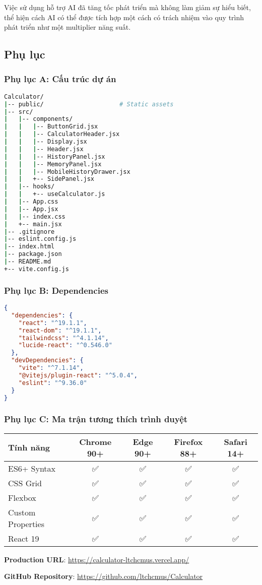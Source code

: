 Việc sử dụng hỗ trợ AI đã tăng tốc phát triển mà không làm giảm sự hiểu biết, thể hiện cách AI có thể được tích hợp một cách có trách nhiệm vào quy trình phát triển như một multiplier năng suất.

\subsection{Phụ lục}

\subsubsection{Phụ lục A: Cấu trúc dự án}

\begin{lstlisting}[language=bash, caption=Cấu trúc thư mục đầy đủ]
Calculator/
|-- public/                     # Static assets
|-- src/
|   |-- components/
|   |   |-- ButtonGrid.jsx
|   |   |-- CalculatorHeader.jsx
|   |   |-- Display.jsx
|   |   |-- Header.jsx
|   |   |-- HistoryPanel.jsx
|   |   |-- MemoryPanel.jsx
|   |   |-- MobileHistoryDrawer.jsx
|   |   +-- SidePanel.jsx
|   |-- hooks/
|   |   +-- useCalculator.js
|   |-- App.css
|   |-- App.jsx
|   |-- index.css
|   +-- main.jsx
|-- .gitignore
|-- eslint.config.js
|-- index.html
|-- package.json
|-- README.md
+-- vite.config.js
\end{lstlisting}

\subsubsection{Phụ lục B: Dependencies}

\begin{lstlisting}[language=JSON, caption=Package.json dependencies]
{
  "dependencies": {
    "react": "^19.1.1",
    "react-dom": "^19.1.1",
    "tailwindcss": "^4.1.14",
    "lucide-react": "^0.546.0"
  },
  "devDependencies": {
    "vite": "^7.1.14",
    "@vitejs/plugin-react": "^5.0.4",
    "eslint": "^9.36.0"
  }
}
\end{lstlisting}

\subsubsection{Phụ lục C: Ma trận tương thích trình duyệt}

\begin{center}
\begin{tabular}{|l|c|c|c|c|}
\hline
\textbf{Tính năng} & \textbf{Chrome 90+} & \textbf{Edge 90+} & \textbf{Firefox 88+} & \textbf{Safari 14+} \\
\hline
ES6+ Syntax & ✅ & ✅ & ✅ & ✅ \\
CSS Grid & ✅ & ✅ & ✅ & ✅ \\
Flexbox & ✅ & ✅ & ✅ & ✅ \\
Custom Properties & ✅ & ✅ & ✅ & ✅ \\
React 19 & ✅ & ✅ & ✅ & ✅ \\
\hline
\end{tabular}
\end{center}

\vspace{1cm}

\noindent \textbf{Production URL}: \url{https://calculator-ltchcmus.vercel.app/}

\noindent \textbf{GitHub Repository}: \url{https://github.com/ltchcmus/Calculator}